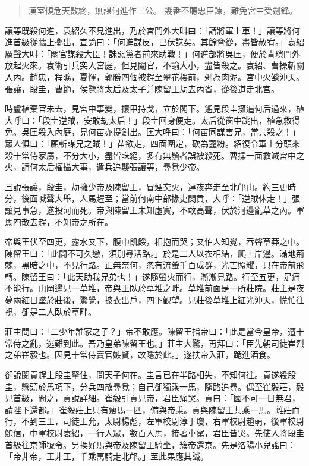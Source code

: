 \begin{quote}
漢室傾危天數終，無謀何進作三公。
幾番不聽忠臣諫，難免宮中受劍鋒。
\end{quote}

讓等既殺何進，袁紹久不見進出，乃於宮門外大叫曰：「請將軍上車！」讓等將何進首級從牆上擲出，宣諭曰：「何進謀反，已伏誅矣。其餘脅從，盡皆赦宥。」袁紹厲聲大叫：「閹官謀殺大臣！誅惡黨者前來助戰！」何進部將吳匡，便於青瑣門外放起火來。袁術引兵突入宮庭，但見閹官，不諭大小，盡皆殺之。袁紹、曹操斬關入內。趙忠，程曠，夏惲，郭勝四個被趕至翠花樓前，剁為肉泥。宮中火燄沖天。張讓，段圭，曹節，侯覽將太后及太子并陳留王劫去內省，從後道走北宮。

時盧植棄官未去，見宮中事變，擐甲持戈，立於閣下。遙見段圭擁逼何后過來，植大呼曰：「段圭逆賊，安敢劫太后！」段圭回身便走。太后從窗中跳出，植急救得免。吳匡殺入內庭，見何苗亦提劍出。匡大呼曰：「何苗同謀害兄，當共殺之！」眾人俱曰：「願斬謀兄之賊！」苗欲走，四面圍定，砍為虀粉。紹復令軍士分頭來殺十常侍家屬，不分大小，盡皆誅絕，多有無鬚者誤被殺死。曹操一面救滅宮中之火，請何太后權攝大事，遣兵追襲張讓等，尋覓少帝。

且說張讓，段圭，劫擁少帝及陳留王，冒煙突火，連夜奔走至北邙山。約三更時分，後面喊聲大舉，人馬趕至；當前何南中部掾吏閔貢，大呼：「逆賊休走！」張讓見事急，遂投河而死。帝與陳留王未知虛實，不敢高聲，伏於河邊亂草之內。軍馬四散去趕，不知帝之所在。

帝與王伏至四更，露水又下，腹中飢餒，相抱而哭；又怕人知覺，吞聲草莽之中。陳留王曰：「此間不可久戀，須別尋活路。」於是二人以衣相結，爬上岸邊。滿地荊棘，黑暗之中，不見行路。正無奈何，忽有流螢千百成群，光芒照耀，只在帝前飛轉。陳留王曰：「此天助我兄弟也！」遂隨螢火而行，漸漸見路。行至五更，足痛不能行。山岡邊見一草堆，帝與王臥於草堆之畔。草堆前面是一所莊院。莊主是夜夢兩紅日墜於莊後，驚覺，披衣出戶，四下觀望。見莊後草堆上紅光沖天，慌忙往視，卻是二人臥於草畔。

莊主問曰：「二少年誰家之子？」帝不敢應。陳留王指帝曰：「此是當今皇帝，遭十常侍之亂，逃難到此。吾乃皇弟陳留王也。」莊主大驚，再拜曰：「臣先朝司徒崔烈之弟崔毅也。因見十常侍賣官嫉賢，故隱於此。」遂扶帝入莊，跪進酒食。

卻說閔貢趕上段圭拏住，問天子何在。圭言已在半路相失，不知何往。貢遂殺段圭，懸頭於馬項下，分兵四散尋覓；自己卻獨乘一馬，隨路追尋。偶至崔毅莊，毅見首級，問之，貢說詳細。崔毅引貢見帝，君臣痛哭。貢曰：「國不可一日無君，請陛下還都。」崔毅莊上只有瘦馬一匹，備與帝乘。貢與陳留王共乘一馬。離莊而行，不到三里，司徒王允，太尉楊彪，左軍校尉淳于瓊，右軍校尉趙萌，後軍校尉鮑信，中軍校尉袁紹，一行人眾，數百人馬，接著車駕，君臣皆哭。先使人將段圭首級往京師號令。另換好馬與帝及陳留王騎坐，簇帝還京。先是洛陽小兒謠曰：「帝非帝，王非王，千乘萬騎走北邙。」至此果應其讖。

